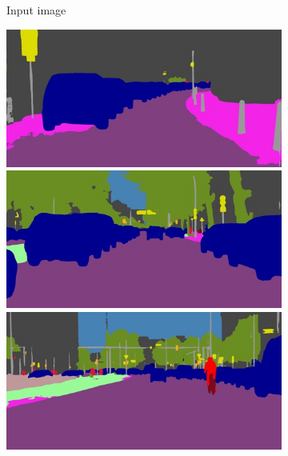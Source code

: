 {\begin{figure}[t]
{{\begin{subfigure}[t]{0.24\linewidth}
\begin{center}
  \caption{Input image}
\end{center}
\end{subfigure}
\begin{subfigure}[t]{0.24\linewidth}
\begin{center}
		\includegraphics[width=\linewidth,trim={0px 60px 0 0px},clip]{qualitative/bielefeld_000000_026296_semantic_segmentation_rgb.jpg}
		\includegraphics[width=\linewidth,trim={0px 60px 0 0px},clip]{qualitative/berlin_000008_000019_semantic_segmentation_rgb.jpg}
		\includegraphics[width=\linewidth,trim={0px 60px 0 0px},clip]{qualitative/berlin_000010_000019_semantic_segmentation_rgb.jpg}

\end{center}
\end{subfigure}}}
\end{figure}}
